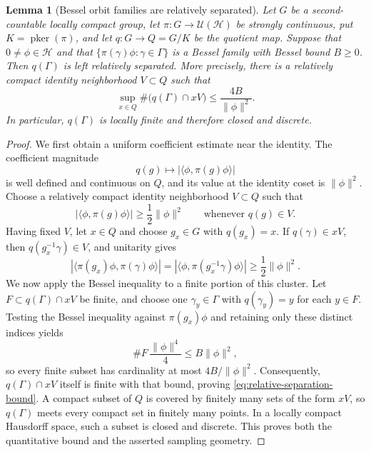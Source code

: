 \documentclass[10pt,a4paper]{amsart}
\numberwithin{equation}{section}
\newtheorem{lemma}[theorem]{Lemma}
\newcommand{\cH}{\mathcal H}
\newcommand{\U}{\mathcal U}
\newcommand{\pker}{\operatorname{pker}}
\begin{document}
\begin{lemma}[Bessel orbit families are relatively separated]
\label{lem:bessel-relative-separation}
Let $G$ be a second-countable locally compact group, let
$\pi:G\to\U(\cH)$ be strongly continuous, put $K=\pker(\pi)$, and let
$q:G\to Q=G/K$ be the quotient map.  Suppose that $0\neq\phi\in\cH$ and
that $\{\pi(\gamma)\phi:\gamma\in\Gamma\}$ is a Bessel family with
Bessel bound $B\geq0$.  Then $q(\Gamma)$ is left relatively separated.  More precisely,
there is a relatively compact identity neighborhood $V\subset Q$ such that
\begin{equation}\label{eq:relative-separation-bound}
  \sup_{x\in Q}\#\bigl(q(\Gamma)\cap xV\bigr)
  \leq \frac{4B}{\|\phi\|^2}.
\end{equation}
In particular, $q(\Gamma)$ is locally finite and therefore closed and
discrete.
\end{lemma}

\begin{proof}
We first obtain a uniform coefficient estimate near the identity.  The
coefficient magnitude
\[
  q(g)\longmapsto |\langle\phi,\pi(g)\phi\rangle|
\]
is well defined and continuous on $Q$, and its value at the identity coset
is $\|\phi\|^2$.  Choose a relatively compact identity neighborhood
$V\subset Q$ such that
\begin{equation}\label{eq:coefficient-near-identity}
 |\langle\phi,\pi(g)\phi\rangle|
 \geq \frac12\|\phi\|^2
 \qquad\text{whenever }q(g)\in V.
\end{equation}
Having fixed $V$, let $x\in Q$ and choose $g_x\in G$ with $q(g_x)=x$.  If
$q(\gamma)\in xV$, then $q(g_x^{-1}\gamma)\in V$, and unitarity gives
\[
 |\langle\pi(g_x)\phi,\pi(\gamma)\phi\rangle|
 =|\langle\phi,\pi(g_x^{-1}\gamma)\phi\rangle|
 \geq \frac12\|\phi\|^2.
\]
We now apply the Bessel inequality to a finite portion of this cluster.  Let
$F\subset q(\Gamma)\cap xV$ be finite, and choose one
$\gamma_y\in\Gamma$ with $q(\gamma_y)=y$ for each $y\in F$.  Testing the
Bessel inequality against $\pi(g_x)\phi$ and retaining only these distinct
indices yields
\[
 \#F\,\frac{\|\phi\|^4}{4}
 \leq B\|\phi\|^2,
\]
so every finite subset has cardinality at most $4B/\|\phi\|^2$.  Consequently,
$q(\Gamma)\cap xV$ itself is finite with that bound, proving
\eqref{eq:relative-separation-bound}.  A compact subset of $Q$
is covered by finitely many sets of the form $xV$, so $q(\Gamma)$ meets every
compact set in finitely many points.  In a locally compact Hausdorff space,
such a subset is closed and discrete.  This proves both the quantitative
bound and the asserted sampling geometry.
\end{proof}
\end{document}
